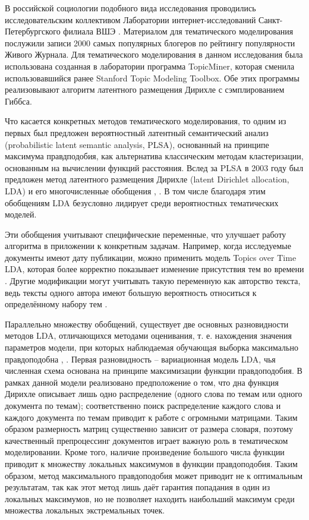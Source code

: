 В российской социологии подобного вида исследования проводились исследовательским коллективом Лаборатории интернет-исследований Санкт-Петербургского филиала ВШЭ \cite{kolcovalda}. Материалом для тематического моделирования послужили записи 2000 самых популярных блогеров по рейтингу популярности Живого Журнала. Для тематического моделирования в данном исследования была использована созданная в лаборатории программа TopicMiner, которая сменила использовавшийся ранее Stanford Topic Modeling Toolbox. Обе этих программы реализовывают алгоритм латентного размещения Дирихле с сэмплированием Гиббса.

Что касается конкретных методов тематического моделирования, то одним из первых был предложен вероятностный латентный семантический анализ (probabilistic latent semantic analysis, PLSA), основанный на принципе максимума правдподобия, как альтернатива классическим методам кластеризации, основанным на вычислении функций расстояния. Вслед за PLSA в 2003 году был предложен метод латентного размещения Дирихле (latent Dirichlet allocation, LDA) \cite{LDAOrigin} и его многочисленные обобщения \cite{NeedlesInAHaystack}, \cite{LDASurvey}. В том числе благодаря этим обобщениям LDA безусловно лидирует среди вероятностных тематических моделей.

Эти обобщения учитывают специфические переменные, что улучшает работу алгоритма в приложении к конкретным задачам. Например, когда исследуемые документы имеют дату публикации, можно применить модель Topics over Time LDA, которая более корректно показывает изменение присутствия тем во времени \cite{ToTLDA}. Другие модификации могут учитывать такую переменную как авторство текста, ведь тексты одного автора имеют большую вероятность относиться к определённому набору тем \cite{authorLDA}.

Параллельно множеству обобщений, существует две основных разновидности методов LDA, отличающихся методами оценивания, т. е. нахождения значения параметров модели, при которых наблюдаемая обучающая выборка максимально правдоподобна \cite{kolcovaJJ}, \cite[стр. 1]{HoffmanBB10}. Первая разновидность -- вариационная модель LDA, чья численная схема основана на принципе максимизации функции правдоподобия. В рамках данной модели реализовано предположение о том, что дна функция Дирихле описывает лишь одно распределение (одного слова по темам или одного документа по темам); соответственно поиск распределение каждого слова и каждого документа по темам приводит к работе с огромными матрицами. Таким образом размерность матриц существенно зависит от размера словаря, поэтому качественный препроцессинг документов играет важную роль в тематическом моделировании. Кроме того, наличие произведение большого числа функции приводит к множеству локальных максимумов в функции правдоподобия. Таким образом, метод максимального правдоподобия может приводит не к оптимальным результатам, так как этот метод лишь даёт гарантия попадания в один из локальных максимумов, но не позволяет находить наибольший максимум среди множества локальных экстремальных точек.

